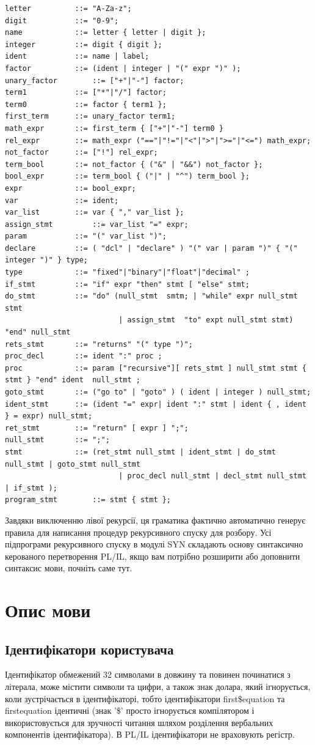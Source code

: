 \documentclass{memoir}
\begin{document}
\begin{lstlisting}
letter			::= "A-Za-z";
digit 			::= "0-9";
name 			::= letter { letter | digit };
integer 		::= digit { digit };
ident 			::= name | label;
factor 			::= (ident | integer | "(" expr ")" );
unary_factor 		::= ["+"|"-"] factor;
term1 			::= ["*"|"/"] factor;
term0 			::= factor { term1 };
first_term 		::= unary_factor term1;
math_expr 		::= first_term { ["+"|"-"] term0 }
rel_expr 		::= math_expr ("=="|"!="|"<"|">"|">="|"<=") math_expr;
not_factor 		::= ["!"] rel_expr;
term_bool 		::= not_factor { ("&" | "&&") not_factor };
bool_expr 		::= term_bool { ("|" | "^") term_bool };
expr 			::= bool_expr;
var 			::= ident;
var_list 		::= var { "," var_list };
assign_stmt 		::= var_list "=" expr;
param 			::= "(" var_list ")";
declare 		::= ( "dcl" | "declare" ) "(" var | param ")" { "(" integer ")" } type;
type			::= "fixed"|"binary"|"float"|"decimal" ;
if_stmt 		::= "if" expr "then" stmt [ "else" stmt;
do_stmt 		::= "do" (null_stmt  smtm; | "while" expr null_stmt stmt
                          | assign_stmt  "to" expt null_stmt stmt) "end" null_stmt
rets_stmt		::= "returns" "(" type ")";
proc_decl 		::= ident ":" proc ;
proc 			::= param ["recursive"][ rets_stmt ] null_stmt stmt { stmt } "end" ident  null_stmt ;
goto_stmt 		::= ("go to" | "goto" ) ( ident | integer ) null_stmt;
ident_stmt 		::= (ident "=" expr| ident ":" stmt | ident { , ident } = expr) null_stmt;
ret_stmt 		::= "return" [ expr ] ";";
null_stmt 		::= ";";
stmt 			::= (ret_stmt null_stmt | ident_stmt | do_stmt null_stmt | goto_stmt null_stmt
                          | proc_decl null_stmt | decl_stmt null_stmt | if_stmt );
program_stmt  		::= stmt { stmt };
\end{lstlisting}

Завдяки виключенню лівої рекурсії, ця граматика фактично автоматично генерує
правила для написання процедур рекурсивного спуску для розбору. Усі підпрограми
рекурсивного спуску в модулі SYN складають основу синтаксично керованого
перетворення PL/IL, якщо вам потрібно розширити або доповнити синтаксис
мови, почніть саме тут.

\section{Опис мови}
\subsection{Ідентифікатори користувача}
Ідентифікатор обмежений 32 символами в довжину та повинен починатися з літерала,
може містити символи та цифри, а також знак долара, який ігнорується, коли
зустрічається в ідентифікаторі, тобто ідентифікатори first\$equation та
firstequation ідентичні (знак '\$' просто ігнорується компілятором і
використовується для зручності читання шляхом розділення вербальних
компонентів ідентифікатора). В PL/IL ідентифікатори не враховують регістр.
\end{document}
